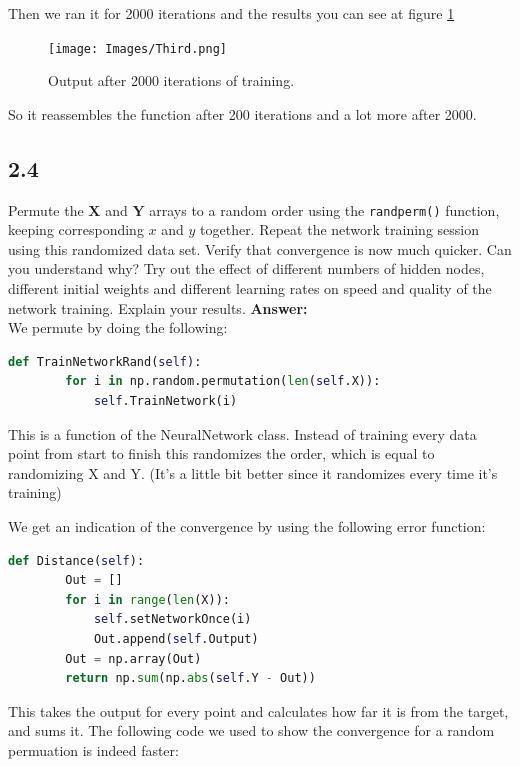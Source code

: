 \documentclass[a4paper]{article}
\begin{document}
Then we ran it for 2000 iterations and the results you can see at figure \ref{Third}

\begin{figure}[H]
\texttt{[image: Images/Third.png]}
\caption{Output after 2000 iterations of training.}
\label{Third}
\end{figure}

So it reassembles the function after 200 iterations and a lot more after 2000. 

\subsection*{2.4}

Permute the $\textbf{X}$ and $\textbf{Y}$ arrays to a random order using the \texttt{randperm()} function, keeping corresponding $x$ and $y$ together. Repeat the network training session using this randomized data set. Verify that convergence is now much quicker. Can you understand why? Try out the effect of different numbers of hidden nodes, different initial weights and different learning rates on speed and quality of the network training. Explain your results.
\textbf{Answer:}\\


We permute by doing the following:


\begin{lstlisting}[language=Python]
    def TrainNetworkRand(self):
        for i in np.random.permutation(len(self.X)):
            self.TrainNetwork(i)
\end{lstlisting}

This is a function of the NeuralNetwork class. Instead of training every data point from start to finish this randomizes the order, which is equal to randomizing X and Y. (It's a little bit better since it randomizes every time it's training)

We get an indication of the convergence by using the following error function:

\begin{lstlisting}[language=Python]
    def Distance(self):
        Out = []
        for i in range(len(X)):
            self.setNetworkOnce(i)
            Out.append(self.Output)
        Out = np.array(Out)
        return np.sum(np.abs(self.Y - Out))
\end{lstlisting}

This takes the output for every point and calculates how far it is from the target, and sums it. The following code we used to show the convergence for a random permuation is indeed faster:
\end{document}
